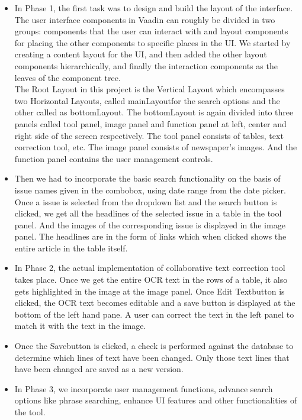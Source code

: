 \documentclass[amsart, 12pt]{article}
\begin{document}
\begin{itemize}
    \item In Phase 1, the first task was to design and build the layout of the interface. The user interface components in Vaadin can roughly be divided in two groups: components that the user can interact with and layout components for placing the other components to specific places in the UI. We started by creating a content layout for the UI, and then added the other layout components hierarchically, and finally the interaction components as the leaves of the component tree.\\
The Root Layout in this project is the Vertical Layout which encompasses two Horizontal Layouts, called \textasciigrave mainLayout\textasciiacute for the search options and the other called as \textasciigrave bottomLayout\textasciiacute. The bottomLayout is again divided into three panels called tool panel, image panel and function panel at left, center and right side of the screen respectively. The tool panel consists of tables, text correction tool, etc. The image panel consists of newspaper's images. And the function panel contains the user management controls.

\item Then we had to incorporate the basic search functionality on the basis of issue names given in the combobox, using date range from the date picker.
Once a issue is selected from the dropdown list and the search button is clicked, we get all the headlines of the selected issue in a table in the tool panel. And the images of the corresponding issue is displayed in the image panel. The headlines are in the form of links which when clicked shows the entire article in the table itself.
\item In Phase 2, the actual implementation of collaborative text correction tool takes place. Once we get the entire OCR text in the rows of a table, it also gets highlighted in the image at the image panel. Once \textasciigrave Edit Text\textasciiacute button is clicked, the OCR text becomes editable and a save button is displayed at the bottom of the left hand pane. A user can correct the text in the left panel to match it with the text in the image. 
\item Once the \textasciigrave Save\textasciiacute button is clicked, a check is performed against the database to determine which lines of text have been changed.  Only those text lines that have been changed are saved as a new version.
\item In Phase 3, we incorporate user management functions, advance search options like phrase searching, enhance UI features and other functionalities of the tool.
\end{itemize}
\end{document}
